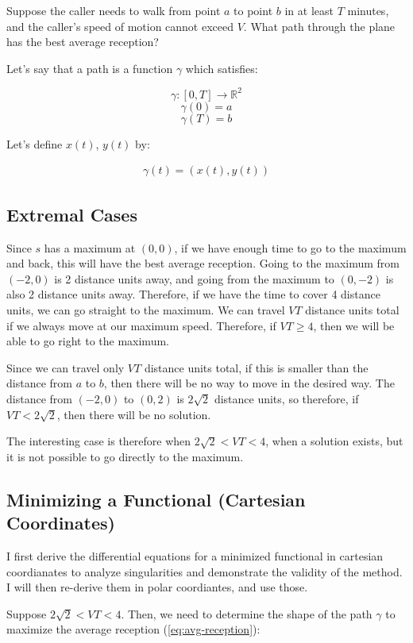 \documentclass{article}
\begin{document}
Suppose the caller needs to walk from point $a$ to point $b$ in at least $T$ minutes, 
	and the caller's speed of motion cannot exceed $V$.
What path through the plane has the best average reception?

Let's say that a path is a function $\gamma$ which satisfies:

\[ \gamma : [0,T] \to \mathbb{R}^2 \]
\[ \gamma(0) = a \]
\[ \gamma(T) = b \]

Let's define $x(t)$, $y(t)$ by:

\begin{align}
\gamma(t) = (x(t), y(t))
\end{align}

\subsection{Extremal Cases}

Since $s$ has a maximum at $(0,0)$, if we have enough time to go to the maximum
	and back, this will have the best average reception.
Going to the maximum from $(-2,0)$ is 2 distance units away, and going from
	the maximum to $(0,-2)$ is also 2 distance units away.
Therefore, if we have the time to cover 4 distance units, we can go straight to the
	maximum.
We can travel $V T$ distance units total if we always move at our maximum speed.
Therefore, if $V T \geq 4$, then we will be able to go right to the maximum.

Since we can travel only $ V T$ distance units total, if this is smaller than 
	the distance from $a$ to $b$, then there will be no way to move in the 
	desired way.
The distance from $(-2,0)$ to $(0,2)$ is $2 \sqrt{2}$ distance units, so therefore,
	if $V T < 2 \sqrt{2}$, then there will be no solution.

The interesting case is therefore when $2 \sqrt{2} < V T < 4$, when a solution
	exists, but it is not possible to go directly to the maximum.

\subsection{Minimizing a Functional (Cartesian Coordinates)} 

I first derive the differential equations for a minimized functional
	in cartesian coordianates to analyze singularities and demonstrate
	the validity of the method.
I will then re-derive them in polar coordiantes, and use those.

Suppose $2 \sqrt{2} < V T < 4  $.
Then, we need to determine the shape of the path $\gamma$ to maximize the
	average reception (\ref{eq:avg-reception}):
\end{document}
